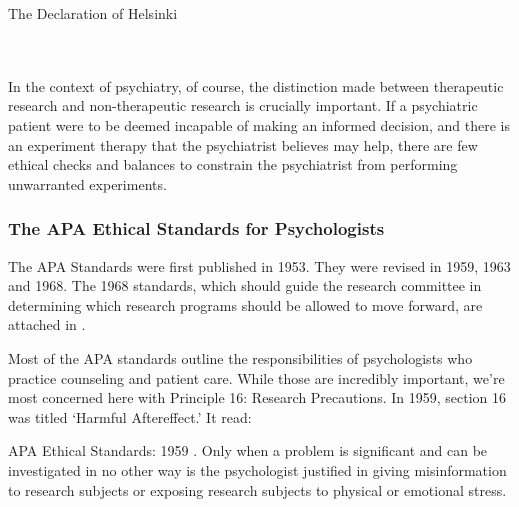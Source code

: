 \begin{refsection}
\begin{apatextbox}{The Declaration of Helsinki}
\\

\\

\\

 \end{apatextbox}

In the context of psychiatry, of course, the distinction made between therapeutic research and non-therapeutic research is crucially important. If a psychiatric patient were to be deemed incapable of making an informed decision, and there is an experiment therapy that the psychiatrist believes may help, there are few ethical checks and balances to constrain the psychiatrist from performing unwarranted experiments.

\subsubsection{The APA Ethical Standards for Psychologists}
\label{theapaethicalstandardsforpsychologists}

The APA Standards were first published in 1953. They were revised in 1959, 1963 and 1968. The 1968 standards, which should guide the research committee in determining which research programs should be allowed to move forward, are attached in .

Most of the APA standards outline the responsibilities of psychologists who practice counseling and patient care. While those are incredibly important, we're most concerned here with Principle 16: Research Precautions. In 1959, section 16 was titled `Harmful Aftereffect.' It read:

\begin{apatextbox}{APA Ethical Standards: 1959}\label{sample:APAEthics1959}
. Only when a problem is significant and can be investigated in no other way is the psychologist justified in giving misinformation to research subjects or exposing research subjects to physical or emotional stress.\\


\end{apatextbox}
\end{refsection}
